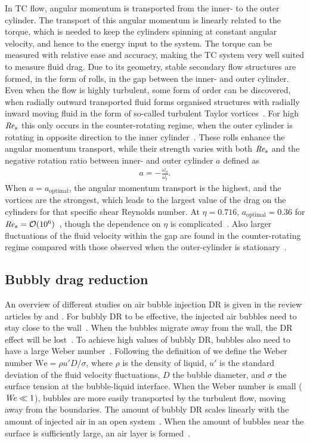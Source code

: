 \documentclass[aps,twocolumn,10pt,floatfix, superscriptaddress,longbibliography,pra]{revtex4-1}
\newcommand\Rey{\mbox{\textit{Re$_s$}}}  %
\newcommand\We{\mbox{\textit{We}}}  %
\begin{document}
In TC flow, angular momentum is transported from the inner- to the outer cylinder. The transport of this angular momentum is linearly related to the torque, which is needed to keep the cylinders spinning at constant angular velocity, and hence to the energy input to the system. The torque can be measured with relative  ease and accuracy, making the TC system very well suited to measure fluid drag. Due to its geometry, stable secondary flow structures are formed, in the form of rolls, in the gap between the inner- and outer cylinder. Even when the flow is highly turbulent, some form of order can be discovered, when radially outward transported fluid forms organised structures with radially inward moving fluid in the form of so-called turbulent Taylor vortices~\citep{Andereck1986}. For high $\Rey$ this only occurs in the counter-rotating regime, when the outer cylinder is rotating in opposite direction to the inner cylinder~\citep{Ostilla-Monico2014,Grossmann2016}. These rolls enhance the angular momentum transport, while their strength varies with both $\Rey$ and the negative rotation ratio between inner- and outer cylinder $a$ defined as
    \begin{align}\label{eq:a}
        a = -\frac{\omega_o}{\omega_i}.
    \end{align}
When $a = a_\text{optimal}$, the angular momentum transport is the highest, and the vortices are the strongest, which leads to the largest value of the drag on the cylinders for that specific shear Reynolds number. At $\eta=0.716$, $a_\text{optimal} = 0.36$ for $\Rey = \mathcal{O}(10^6)$~\citep{Huisman2014}, though the dependence on $\eta$ is complicated~\citep{Ostilla2014}.
Also larger fluctuations of the fluid velocity within the gap are found in the counter-rotating regime compared with those observed when the outer-cylinder is stationary~\citep{Dong2008,Huisman2013b}.

\subsection{Bubbly drag reduction}
An overview of different studies on air bubble injection DR is given in the review articles by \cite{Ceccio2010} and \cite{Murai2014}. For bubbly DR to be effective, the injected air bubbles need to stay close to the wall~\citep{vandenBerg2007}. When the bubbles migrate away from the wall, the DR effect will be lost~\citep{Watanabe1998,Lu2005,Murai2005,Sanders2006,Elbing2008,Lu2008,Murai2014}. To achieve high values of bubbly DR, bubbles also need to have a large Weber number~\citep{vanGils2013,Verschoof2016,Spandan2018}. Following the definition of \citep{vandenBerg2005} we define the Weber number $\text{We}=\rho u' D / \sigma$, where $\rho$ is the density of liquid, $u'$ is the standard deviation of the fluid velocity fluctuations, $D$ the bubble diameter, and $\sigma$ the surface tension at the bubble-liquid interface. When the Weber number is small ($\We \ll 1$), bubbles are more easily transported by the turbulent flow, moving away from the boundaries. The amount of bubbly DR scales linearly with the amount of injected air in an open system~\citep{Elbing2008}. When the amount of bubbles near the surface is sufficiently large, an air layer is formed~\citep{Zverkhovskyi2014,Rotte2016}.
\end{document}
